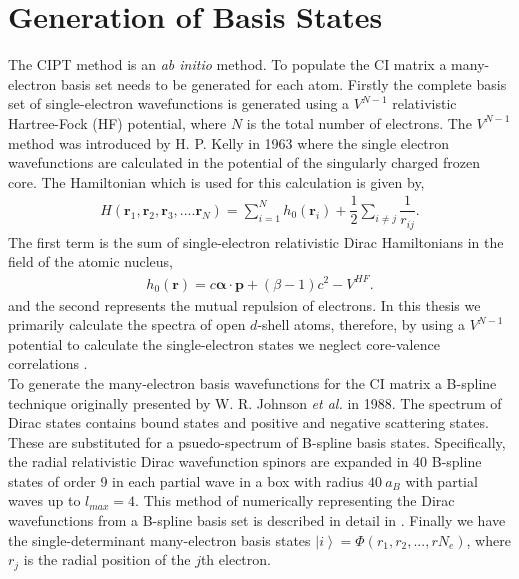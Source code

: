 \documentclass[10pt,a4paper, twoside, openright]{report}
\begin{document}
\section{Generation of Basis States} \label{sec:HF}
The CIPT method is an \textit{ab initio} method. To populate the CI matrix a many-electron basis set needs to be generated for each atom. Firstly the complete basis set of single-electron wavefunctions is generated using a $V^{N-1}$ relativistic Hartree-Fock (HF) potential, where $N$ is the total number of electrons. The $V^{N-1}$ method was introduced by H. P. Kelly in 1963 \cite{Kelly1963, Kelly1964} where the single electron wavefunctions are calculated in the potential of the singularly charged frozen core.  The Hamiltonian which is used for this calculation is given by,
\begin{align}
H\left(\textbf{r}_1,\textbf{r}_2, \textbf{r}_3, .... \textbf{r}_N\right) = \sum_{i=1}^{N} h_0\left(\textbf{r}_i\right) + \dfrac{1}{2}\sum_{i\neq j}\dfrac{1}{r_{ij}}.
\end{align}
The first term is the sum of single-electron relativistic Dirac Hamiltonians in the field of the atomic nucleus,
\begin{align*}
h_0\left(\textbf{r}\right) = c \boldsymbol{\alpha}\cdot\textbf{p} + (\beta - 1) c^2 - V^{HF}.
\end{align*}
and the second represents the mutual repulsion of electrons.   In this thesis we primarily calculate the spectra of open $d$-shell atoms, therefore, by using a $V^{N-1}$ potential to calculate the single-electron states we neglect core-valence correlations \cite{DBHF2017}. \\
\linebreak
To generate the many-electron basis wavefunctions for the CI matrix a  B-spline technique originally presented by W. R. Johnson \textit{et al.} in 1988\cite{Johnson1988}. The spectrum of Dirac states contains bound states and positive and negative scattering states. These are substituted for a psuedo-spectrum of B-spline basis states. Specifically, the radial relativistic Dirac wavefunction spinors are expanded in  40 B-spline states of order 9 in each partial wave in a box with radius $40 \ a_B$ with partial waves up to $l_{max}=4$. This method of numerically representing the Dirac wavefunctions from a B-spline basis set is described in detail in \cite{JohnsonAST}.  Finally we have the single-determinant many-electron basis states $\left|i\right> = \Phi\left(r_1, r_2, ... , r{N_e}\right)$, where $r_j$ is the radial position of the $j$th electron.
\end{document}
